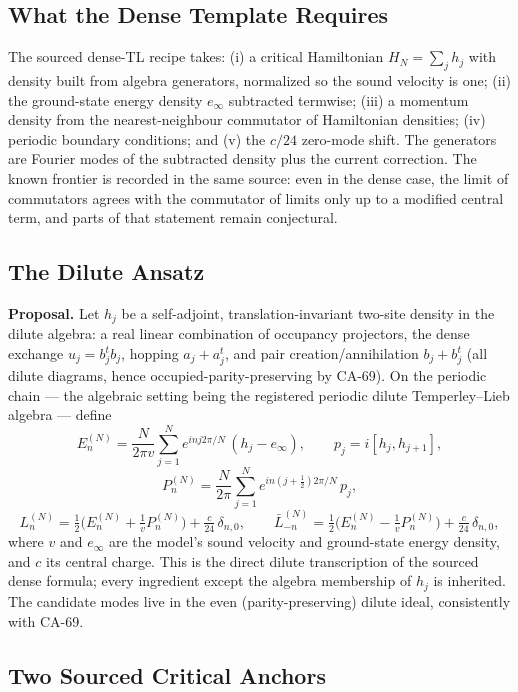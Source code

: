 \subsection{What the Dense Template Requires}

The sourced dense-TL recipe takes: (i) a critical Hamiltonian
\(H_N=\sum_j h_j\) with density built from algebra generators, normalized so
the sound velocity is one; (ii) the ground-state energy density \(e_\infty\)
subtracted termwise; (iii) a momentum density from the nearest-neighbour
commutator of Hamiltonian densities; (iv) periodic boundary conditions; and
(v) the \(c/24\) zero-mode shift.  The generators are Fourier modes of the
subtracted density plus the current correction.  The known frontier is
recorded in the same source: even in the dense case, the limit of commutators
agrees with the commutator of limits only up to a modified central term, and
parts of that statement remain conjectural.

\subsection{The Dilute Ansatz}

\textbf{Proposal.}  Let \(h_j\) be a self-adjoint, translation-invariant
two-site density in the dilute algebra: a real linear combination of
occupancy projectors, the dense exchange \(u_j=b_j^tb_j\), hopping
\(a_j+a_j^t\), and pair creation/annihilation \(b_j+b_j^t\) (all dilute
diagrams, hence occupied-parity-preserving by CA-69).  On the periodic
chain --- the algebraic setting being the registered periodic dilute
Temperley--Lieb algebra --- define
\[
  E_n^{(N)}=\frac{N}{2\pi v}\sum_{j=1}^{N}e^{inj2\pi/N}\,(h_j-e_\infty),
  \qquad
  p_j=i[h_j,h_{j+1}],
\]
\[
  P_n^{(N)}=\frac{N}{2\pi}\sum_{j=1}^{N}e^{in(j+\frac12)2\pi/N}\,p_j,
\]
\[
  L_n^{(N)}=\tfrac12\bigl(E_n^{(N)}+\tfrac1v P_n^{(N)}\bigr)
  +\tfrac{c}{24}\,\delta_{n,0},
  \qquad
  \bar L_{-n}^{(N)}=\tfrac12\bigl(E_n^{(N)}-\tfrac1v P_n^{(N)}\bigr)
  +\tfrac{c}{24}\,\delta_{n,0},
\]
where \(v\) and \(e_\infty\) are the model's sound velocity and ground-state
energy density, and \(c\) its central charge.  This is the direct dilute
transcription of the sourced dense formula; every ingredient except the
algebra membership of \(h_j\) is inherited.  The candidate modes live in the
even (parity-preserving) dilute ideal, consistently with CA-69.

\subsection{Two Sourced Critical Anchors}

